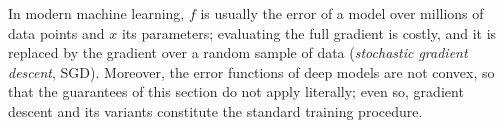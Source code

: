 \documentclass[11pt, a4paper]{article}
\begin{document}
\obs In modern machine learning, $f$ is usually the error of a model over millions of data points and $x$ its parameters; evaluating the full gradient is costly, and it is replaced by the gradient over a random sample of data (\emph{stochastic gradient descent}, SGD). Moreover, the error functions of deep models are not convex, so that the guarantees of this section do not apply literally; even so, gradient descent and its variants constitute the standard training procedure.
\end{document}
